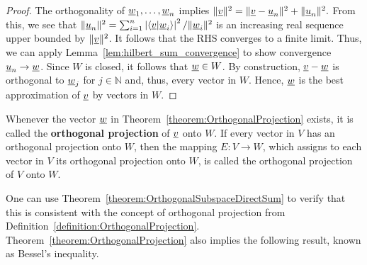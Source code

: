 \begin{proof}
The orthogonality of $\underline{w}_1,\ldots,\underline{w}_n$ implies $\|\underline{v}\|^2 = \| \underline{v} - \underline{u}_n \|^2 + \|\underline{u}_n\|^2.$
From this, we see that $\| \underline{u}_n \|^2 = \sum_{i=1}^n \left|\langle \underline{v} | \underline{w}_i \rangle \right|^2 / \|\underline{w}_i\|^2$ is an increasing real sequence upper bounded by $\|\underline{v}\|^2$.
It follows that the RHS converges to a finite limit.
Thus, we can apply Lemma~\ref{lem:hilbert_sum_convergence} to show convergence $\underline{u}_n \to \underline{w}$.
Since $W$ is closed, it follows that $\underline{w} \in W$.
By construction, $\underline{v} -\underline{w}$ is orthogonal to $\underline{w}_j$ for $j \in \mathbb{N}$ and, thus, every vector in $W$.
Hence, $\underline{w}$ is the best approximation of $\underline{v}$ by vectors in $W$.
\end{proof}

\begin{definition}
Whenever the vector $\underline{w}$ in Theorem~\ref{theorem:OrthogonalProjection} exists, it is called the \textbf{orthogonal projection} of $\underline{v}$ onto $W$.
If every vector in $V$ has an orthogonal projection onto $W$, then the mapping $E \colon V \rightarrow W$, which assigns to each vector in $V$ its orthogonal projection onto $W$, is called the orthogonal projection of $V$ onto $W$.
\end{definition}

One can use Theorem~\ref{theorem:OrthogonalSubspaceDirectSum} to verify that this is consistent with the concept of orthogonal projection from Definition~\ref{definition:OrthogonalProjection}.
Theorem~\ref{theorem:OrthogonalProjection} also implies the following result, known as Bessel's inequality.

